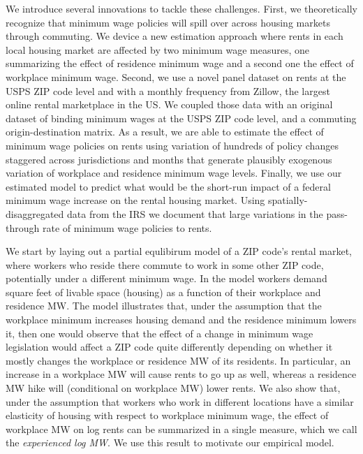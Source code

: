 We introduce several innovations to tackle these challenges.
First, we theoretically recognize that minimum wage policies will spill over across
housing markets through commuting.
We device a new estimation approach where rents in each local housing market are 
affected by two minimum wage measures, one summarizing the effect of residence 
minimum wage and a second one the effect of workplace minimum wage.
Second, we use a novel panel dataset on rents at the USPS ZIP code level and with a
monthly frequency from Zillow, the largest online rental marketplace in the US.
We coupled those data with an original dataset of binding minimum wages at the USPS
ZIP code level, and a commuting origin-destination matrix.
As a result, we are able to estimate the effect of minimum wage policies on rents 
using variation of hundreds of policy changes staggered across jurisdictions and 
months that generate plausibly exogenous variation of workplace and residence minimum 
wage levels.
Finally, we use our estimated model to predict what would be the short-run impact
of a federal minimum wage increase on the rental housing market.
Using spatially-disaggregated data from the IRS we document that large variations
in the pass-through rate of minimum wage policies to rents.


We start by laying out a partial equlibirum model of a ZIP code's rental market, 
where workers who reside there commute to work in some other ZIP code, potentially 
under a different minimum wage.
In the model workers demand square feet of livable space (housing) as a function
of their workplace and residence MW.
The model illustrates that, under the assumption that the workplace minimum increases
housing demand and the residence minimum lowers it, then one would observe that the 
effect of a change in minimum wage legislation would affect a ZIP code quite 
differently depending on whether it mostly changes the workplace or residence MW 
of its residents.
In particular, an increase in a workplace MW will cause rents to go up as well, 
whereas a residence MW hike will (conditional on workplace MW) lower rents.
We also show that, under the assumption that workers who work in different locations
have a similar elasticity of housing with respect to workplace minimum wage, the effect
of workplace MW on log rents can be summarized in a single measure, which we call the 
\textit{experienced log MW}.
We use this result to motivate our empirical model.

